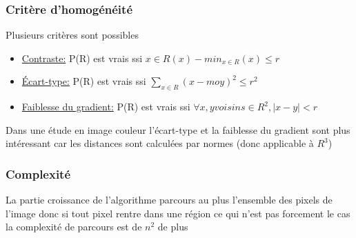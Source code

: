 \documentclass{beamer}
\begin{document}
\begin{frame}
\frametitle{Critère d'homogénéité}
Plusieurs critères sont possibles
\begin{itemize}
\item \underline{Contraste:} P(R) est vrais ssi ${x \in R}(x) -min_{x \in R}(x) \leq r$
\item \underline{Écart-type:} P(R) est vrais ssi $\sum_{x \in R} (x- moy)^2 \leq r^2$
\item \underline{Faiblesse du gradient:} P(R) est vrais ssi $\forall x,y voisins \in R^2, |x-y| < r$
\end{itemize}

Dans une étude en image couleur l'écart-type et la faiblesse du gradient sont plus intéressant car les distances sont calculées par normes (donc applicable à $R^3$)
\end{frame}

\begin{frame}
\frametitle{Complexité}
La partie croissance de l'algorithme parcours au plus l'ensemble des pixels de l'image
donc si tout pixel rentre dans une région ce qui n'est pas forcement le cas la complexité de parcours est de $n^2$ de plus 
\end{frame}
\end{document}

